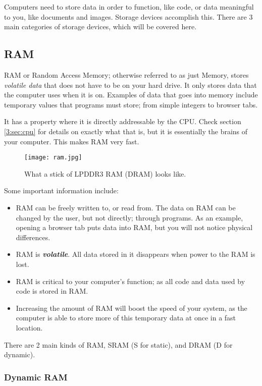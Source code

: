 \documentclass[../main.tex]{subfiles}
\begin{document}
Computers need to store data in order to function, like code, or data meaningful to you, like documents and images. Storage devices accomplish this. There are 3 main categories of storage devices, which will be covered here.

\subsection{RAM}
\label{3:sec:ram}

RAM or Random Access Memory; otherwise referred to as just Memory, stores \emph{volatile data} that does not have to be on your hard drive. It only stores data that the computer uses when it is on. Examples of data that goes into memory include temporary values that programs must store; from simple integers to browser tabs.

It has a property where it is directly addressable by the CPU. Check section \ref{3:sec:cpu} for details on exactly what that is, but it is essentially the brains of your computer. This makes RAM very fast.

\begin{figure}[H]
    \centering
    \texttt{[image: ram.jpg]}
    \caption{What a stick of LPDDR3 RAM (DRAM) looks like.}
    \label{fig:ram}
\end{figure}

Some important information include:

\begin{itemize}
    \item RAM can be freely written to, or read from. The data on RAM can be changed by the user, but not directly; through programs. As an example, opening a browser tab puts data into RAM, but you will not notice physical differences.
    \item RAM is \textbf{\emph{volatile}}. All data stored in it disappears when power to the RAM is lost.
    \item RAM is critical to your computer's function; as all code and data used by code is stored in RAM.
    \item Increasing the amount of RAM will boost the speed of your system, as the computer is able to store more of this temporary data at once in a fast location.
\end{itemize}

There are 2 main kinds of RAM, SRAM (S for static), and DRAM (D for dynamic).

\subsubsection{Dynamic RAM}
\end{document}
